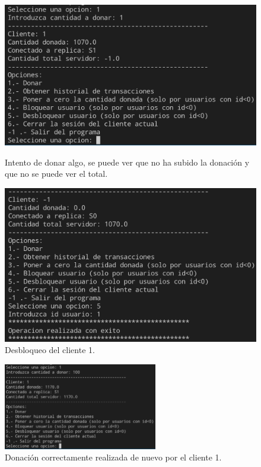 \documentclass{article}
\begin{document}
\begin{figure}[H]
    \centering
    \begin{minipage}[H]{0.45\textwidth}
        \centering
        \includegraphics[width=\textwidth]{imagenes/bloqueo/3.png}
        \caption{Intento de donar algo, se puede ver que no ha subido la donación y que no se puede ver el total.}
    \end{minipage}
    \hfill
    \begin{minipage}[H]{0.45\textwidth}
        \centering
        \includegraphics[width=\textwidth]{imagenes/bloqueo/4.png}
        \caption{Desbloqueo del cliente 1.}
    \end{minipage}
\end{figure}

\begin{figure}[H]
    \centering
    \includegraphics[width=0.6\textwidth]{imagenes/bloqueo/5.png}
    \caption{Donación correctamente realizada de nuevo por el cliente 1.}
\end{figure}
\end{document}
